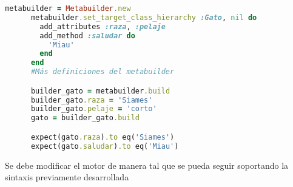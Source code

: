 \documentclass[spanish,a4paper]{article}
\begin{document}
  \begin{lstlisting}[language=Ruby]
      metabuilder = Metabuilder.new
      metabuilder.set_target_class_hierarchy :Gato, nil do
        add_attributes :raza, :pelaje
        add_method :saludar do
          'Miau'
        end
      end
      #Más definiciones del metabuilder

      builder_gato = metabuilder.build
      builder_gato.raza = 'Siames'
      builder_gato.pelaje = 'corto'
      gato = builder_gato.build

      expect(gato.raza).to eq('Siames')
      expect(gato.saludar).to eq('Miau')
  \end{lstlisting}

Se debe modificar el motor de manera tal que se pueda seguir soportando la sintaxis previamente desarrollada
\end{document}
